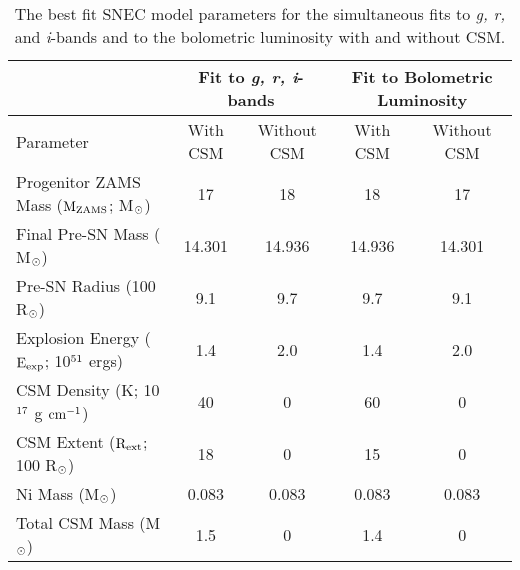 \documentclass[a4paper,fleqn,usenatbib]{mnras}
\newcommand{\msunperiod}{M$\rm{_{\odot}}$}
\begin{document}
\begin{table*}
\centering
\caption{The best fit SNEC model parameters for the simultaneous fits to {\it g, r,} and {\it i}-bands and to the bolometric luminosity with and without CSM.}
\label{tab:BestModel}
\begin{tabular}{l|c|c|c|c|}
\hline
                                                                                            &\multicolumn{2}{|c|}{Fit to {\it g, r, i}-bands} &\multicolumn{2}{|c|}{Fit to Bolometric Luminosity}\\
\hline
Parameter                                                                         & With CSM            & Without CSM     & With CSM & Without CSM\\
\hline
Progenitor ZAMS Mass ($\rm{M_{ZAMS}}$; \msunperiod) &   17                    &     18                    &   18            &17\\
Final Pre-SN Mass ( \msunperiod)                          &   14.301             &      14.936            &     14.936    &14.301\\
Pre-SN Radius (100 R$\rm{_{\odot}}$)                   &  9.1                    &      9.7                  &       9.7       &9.1\\
Explosion Energy ($\rm{E_{exp}}$; 10$\rm{^{51}}$ ergs)    &    1.4                 &     2.0                 &     1.4             &2.0 \\
CSM Density (K; 10$\rm{^{17}}$ g $\rm{cm^{-1}}$)             &     40                  &     0                    &       60           &0 \\
CSM Extent ($\rm{R_{ext}}$; 100 R$\rm{_{\odot}}$)            &     18              &     0                     &      15       &0 \\
Ni Mass (\msunperiod)                                                         &     0.083               &    0.083              &    0.083       &0.083\\
Total CSM Mass (\msunperiod)                                            & 1.5                      &          0               &    1.4            &   0 \\
\hline
\end{tabular}
\end{table*}
\end{document}
